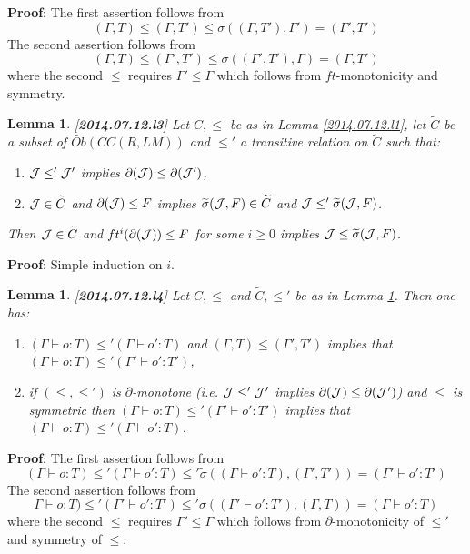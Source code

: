 \documentclass[11pt]{article}
\newenvironment{proof}{{\bf Proof}:}{\vskip 5mm }
\newtheorem{lemma}[proposition]{Lemma}
\newcommand{\llabel}[1]{\label{#1}[{\bf #1}]}
\newcommand{\wt}{\widetilde}
\begin{document}
%
\begin{proof}
The first assertion follows from
%
$$(\Gamma,T)\le (\Gamma,T')\le \sigma((\Gamma,T'),\Gamma')=(\Gamma',T')$$
%
The second assertion  follows from
%
$$(\Gamma,T)\le (\Gamma',T')\le \sigma((\Gamma',T'),\Gamma)=(\Gamma,T')$$
%
where the second $\le$ requires $\Gamma'\le \Gamma$ which follows from $ft$-monotonicity and symmetry.
\end{proof}
%
\begin{lemma}
\llabel{2014.07.12.l3}
Let $C,\le$ be as in Lemma \ref{2014.07.12.l1}, let $\wt{C}$ be a subset of $\wt{Ob}(CC(R,LM))$ and $\le'$ a transitive relation on $\wt{C}$ such that: 
%
\begin{enumerate}
\item ${\cal J}\le' {\cal J}'$ implies $\partial({\cal J})\le\partial({\cal J}')$,
\item ${\cal J}\in \wt{C}$ and $\partial({\cal J})\le F$ implies $\wt{\sigma}({\cal J},F)\in \wt{C}$ and ${\cal J}\le' \wt{\sigma}({\cal J},F)$.
\end{enumerate}
%
Then ${\cal J}\in \wt{C}$ and $ft^i(\partial({\cal J}))\le F$ for some $i\ge 0$ implies ${\cal J}\le \wt{\sigma}({\cal J},F)$. 
\end{lemma}
%
\begin{proof}
Simple induction on $i$.
\end{proof}
%
\begin{lemma}
\llabel{2014.07.12.l4}
Let $C,\le$ and $\wt{C},\le'$ be as in Lemma \ref{2014.07.12.l3}. Then one has:
%
\begin{enumerate}
\item $(\Gamma\vdash o:T)\le' (\Gamma\vdash o':T)$ and $(\Gamma,T)\le (\Gamma',T')$ implies that $(\Gamma\vdash o:T)\le' (\Gamma'\vdash o':T')$,
\item if $(\le,\le')$ is $\partial$-monotone (i.e. ${\cal J}\le' {\cal J}'$ implies $\partial({\cal J})\le \partial({\cal J}')$) and $\le$ is symmetric then $(\Gamma\vdash o:T)\le' (\Gamma'\vdash o':T')$ implies that $(\Gamma\vdash o:T)\le' (\Gamma\vdash o':T)$.
\end{enumerate}
\end{lemma}
%
\begin{proof}
The first assertion follows from
%
$$(\Gamma\vdash o:T)\le'  (\Gamma\vdash o':T)\le' \wt{\sigma}((\Gamma\vdash o':T) ,(\Gamma',T'))=(\Gamma'\vdash o':T')$$
%
The second assertion follows from
%
$$\Gamma\vdash o:T)\le' (\Gamma'\vdash o':T')\le' \sigma((\Gamma'\vdash o':T'),(\Gamma,T))=(\Gamma\vdash o':T)$$
%
where the second $\le$ requires $\Gamma'\le \Gamma$ which follows from $\partial$-monotonicity of $\le'$ and symmetry of $\le$.
\end{proof}
%
\end{document}
